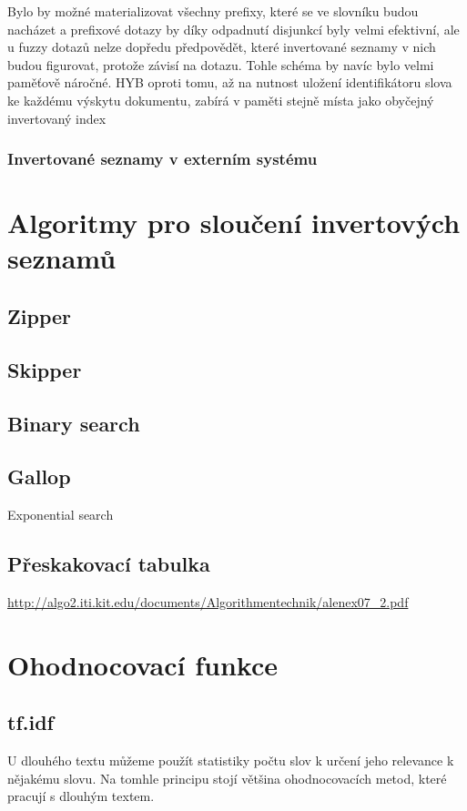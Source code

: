 \documentclass[11pt,letterpaper,oneside,openright]{book}
\begin{document}
Bylo by možné materializovat všechny prefixy, které se ve slovníku budou
nacházet a prefixové dotazy by díky odpadnutí disjunkcí byly velmi efektivní,
ale u fuzzy dotazů nelze dopředu předpovědět, které invertované seznamy v nich
budou figurovat, protože závisí na dotazu. Tohle schéma by navíc bylo velmi
paměťově náročné. HYB oproti tomu, až na nutnost uložení identifikátoru slova
ke každému výskytu dokumentu, zabírá v paměti stejně místa jako obyčejný
invertovaný index

\subsubsection{Invertované seznamy v externím systému}

\section{Algoritmy pro sloučení invertových seznamů}
\subsection{Zipper}
\subsection{Skipper}
\subsection{Binary search}
\subsection{Gallop}
Exponential search
\subsection{Přeskakovací tabulka}
\url{http://algo2.iti.kit.edu/documents/Algorithmentechnik/alenex07_2.pdf}


\section{Ohodnocovací funkce}

\subsection{tf.idf}
U dlouhého textu můžeme použít statistiky počtu slov k určení jeho
relevance k nějakému slovu. Na tomhle principu stojí většina
ohodnocovacích metod, které pracují s dlouhým textem.
\end{document}
